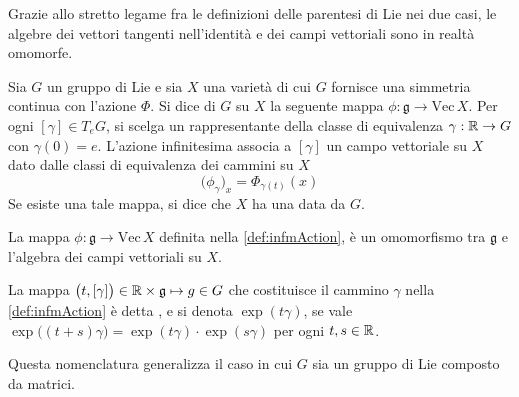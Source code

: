 Grazie allo stretto legame fra le definizioni delle parentesi di Lie nei due casi, le algebre dei vettori tangenti nell'identità e dei campi vettoriali sono in realtà omomorfe.

\begin{definition} \label{def:infmAction}
  Sia $G$ un gruppo di Lie e sia $X$ una varietà di cui $G$ fornisce una simmetria continua con l'azione $\Phi$. Si dice  di $G$ su $X$ la seguente mappa $\phi: \mathfrak{g} \to \mathrm{Vec}\, X$. Per ogni $[\gamma] \in T_e G$, si scelga un rappresentante della classe di equivalenza $\gamma:\mathbb{R}\to G$ con $\gamma(0) = e$. L'azione infinitesima associa a $[\gamma]$ un campo vettoriale su $X$ dato dalle classi di equivalenza dei cammini su $X$
  \begin{equation*}
  \big(\phi_{\gamma}\big)_x = \Phi_{\gamma(t)} (x)
  \end{equation*}
  Se esiste una tale mappa, si dice che $X$ ha una  data da $G$.
\end{definition}
\begin{theorem}
  La mappa $\phi: \mathfrak{g} \to \mathrm{Vec}\, X$ definita nella \autoref{def:infmAction}, è un omomorfismo tra $\mathfrak{g}$ e l'algebra dei campi vettoriali su $X$.
\end{theorem}
\begin{definition}
  La mappa $\big(t, [\gamma]\big) \in \mathbb{R} \times  \mathfrak{g} \mapsto g \in G$ che costituisce il cammino $\gamma$ nella \autoref{def:infmAction} è detta , e si denota $\exp(t \gamma)$, se vale $\exp\big((t+s) \gamma\big) = \exp(t \gamma) \cdot  \exp (s \gamma)$ per ogni $t,s \in \mathbb{R}$.
\end{definition}
\begin{remark}
  Questa nomenclatura generalizza il caso in cui $G$ sia un gruppo di Lie composto da matrici.
\end{remark}

